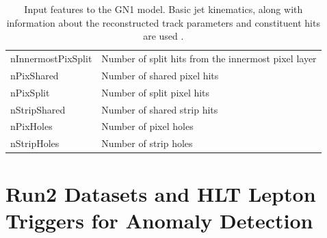 \begin{table}[H]
\begin{tabular}{ |m{5cm} |m{12cm} |}
         nInnermostPixSplit & Number of split hits from the innermost pixel layer \\
         nPixShared & Number of shared pixel hits \\
         nPixSplit & Number of split pixel hits \\
         nStripShared & Number of shared strip hits \\
         nPixHoles & Number of pixel holes \\
         nStripHoles & Number of strip holes \\
         \hline
    \end{tabular}\hfill
    \caption{ Input features to the GN1 model. Basic jet kinematics, along with information about the reconstructed track parameters and constituent hits are used \cite{dl1d-hllhc-ftag}.}
    \label{tab:gn1-var}
\end{table}

\newpage

\vspace*{0.6in}

\section{Run2 Datasets and HLT Lepton Triggers for Anomaly Detection}
\label{appendix:hlt-triggers-ad}
\setcounter{equation}{0}

